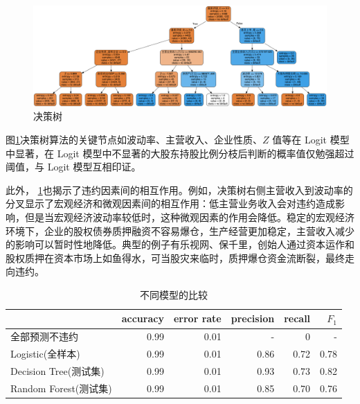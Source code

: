 \begin{figure}[ht]
	\centering
	\includegraphics[width=.9\linewidth]{./data/decision_tree.png}
	\caption{\label{fig:decision_tree}决策树}
\end{figure}

图\ref{fig:decision_tree}决策树算法的关键节点如波动率、主营收入、企业性质、\(Z\) 值等在 Logit 模型中显著，在 Logit 模型中不显著的大股东持股比例分枝后判断的概率值仅勉强超过阈值，与 Logit 模型互相印证。

此外， \ref{fig:decision_tree}也揭示了违约因素间的相互作用。例如，决策树右侧主营收入到波动率的分叉显示了宏观经济和微观因素间的相互作用：低主营业务收入会对违约造成影响，但是当宏观经济波动率较低时，这种微观因素的作用会降低。稳定的宏观经济环境下，企业的股权债券质押融资不容易爆仓，生产经营更加稳定，主营收入减少的影响可以暂时性地降低。典型的例子有乐视网、保千里，创始人通过资本运作和股权质押在资本市场上如鱼得水，可当股灾来临时，质押爆仓资金流断裂，最终走向违约。

\begin{table}
	\caption{\label{tab:acc}不同模型的比较}
	\centering
	\begin{tabular}{lrrrrr}
		                   & accuracy & error rate & precision & recall & \(F_1\) \\
		\hline
		全部预测不违约            & 0.99     & 0.01       & -         & 0      & -       \\
		Logistic(全样本)      & 0.99     & 0.01       & 0.86      & 0.72   & 0.78    \\
		Decision Tree(测试集) & 0.99     & 0.01       & 0.93      & 0.73   & 0.82    \\
		Random Forest(测试集) & 0.99     & 0.01       & 0.85      & 0.70   & 0.76    \\
	\end{tabular}
\end{table}

